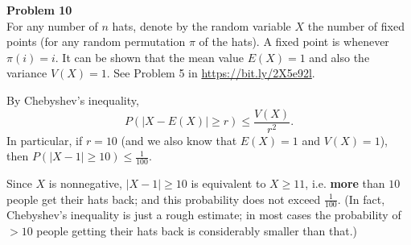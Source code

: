 \documentclass[jou]{apa6}
\begin{document}
\vspace{10pt}
{\bf Problem 10}\\
For any number of $n$ hats, denote by the random variable $X$ the number of 
fixed points (for any random permutation $\pi$ of the hats). 
A fixed point is whenever $\pi(i) = i$. 
It can be shown that the mean value $E(X) = 1$ and also the variance $V(X) = 1$. 
See Problem 5 in \url{https://bit.ly/2X5e92l}. 

By Chebyshev's inequality, 
$$P(|X - E(X)| \geq r) \leq \frac{V(X)}{r^2}.$$
In particular, if $r = 10$ (and we also know that $E(X) = 1$ and $V(X) = 1$), 
then $P(|X - 1| \geq 10) \leq \frac{1}{100}$. 

Since $X$ is nonnegative, $|X - 1| \geq 10$ is equivalent to $X \geq 11$, i.e. 
{\bf more} than $10$ people get their hats back; and this probability does not exceed $\frac{1}{100}$. 
(In fact, Chebyshev's inequality is just a rough estimate; in most cases the
probability of $>10$ people getting their hats back is considerably smaller than that.)
\end{document}
